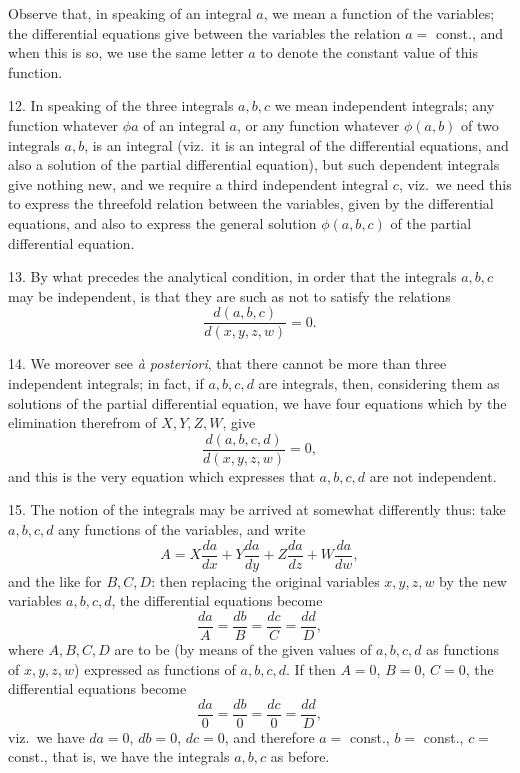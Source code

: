 \documentclass[11pt,a4paper]{article}
\begin{document}
\newpage


Observe that, in speaking of an integral $a$, we mean a function of the variables; the differential equations give between the variables the relation $a = $ const., and when this is so, we use the same letter $a$ to denote the constant value of this function.

12. In speaking of the three integrals $a, b, c$ we mean independent integrals; any function whatever $\phi a$ of an integral $a$, or any function whatever $\phi(a, b)$ of two integrals $a, b$, is an integral (viz.\ it is an integral of the differential equations, and also a solution of the partial differential equation), but such dependent integrals give nothing new, and we require a third independent integral $c$, viz.\ we need this to express the threefold relation between the variables, given by the differential equations, and also to express the general solution $\phi(a, b, c)$ of the partial differential equation.

13. By what precedes the analytical condition, in order that the integrals $a, b, c$ may be independent, is that they are such as not to satisfy the relations
\[
\frac{d(a, b, c)}{d(x, y, z, w)} = 0.
\]

14. We moreover see \emph{\`a posteriori}, that there cannot be more than three independent integrals; in fact, if $a, b, c, d$ are integrals, then, considering them as solutions of the partial differential equation, we have four equations which by the elimination therefrom of $X, Y, Z, W$, give
\[
\frac{d(a, b, c, d)}{d(x, y, z, w)} = 0,
\]
and this is the very equation which expresses that $a, b, c, d$ are not independent.

15. The notion of the integrals may be arrived at somewhat differently thus: take $a, b, c, d$ any functions of the variables, and write
\[
A = X\frac{da}{dx} + Y\frac{da}{dy} + Z\frac{da}{dz} + W\frac{da}{dw},
\]
and the like for $B, C, D$: then replacing the original variables $x, y, z, w$ by the new variables $a, b, c, d$, the differential equations become
\[
\frac{da}{A} = \frac{db}{B} = \frac{dc}{C} = \frac{dd}{D},
\]
where $A, B, C, D$ are to be (by means of the given values of $a, b, c, d$ as functions of $x, y, z, w$) expressed as functions of $a, b, c, d$. If then $A = 0$, $B = 0$, $C = 0$, the differential equations become
\[
\frac{da}{0} = \frac{db}{0} = \frac{dc}{0} = \frac{dd}{D},
\]
viz.\ we have $da = 0$, $db = 0$, $dc = 0$, and therefore $a = $ const., $b = $ const., $c = $ const., that is, we have the integrals $a, b, c$ as before.
\end{document}
